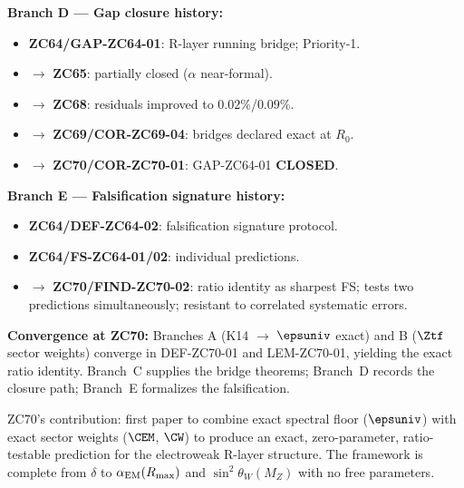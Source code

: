 \documentclass[12pt, a4paper]{article}
\renewcommand{\swsq}{\sin^2\!\theta_W}
\renewcommand{\aEM}{\alpha_{\rm EM}}
\begin{document}
\begin{genealogybox}[title={How ZC70's Key Objects Trace Back}]
\textbf{Branch D --- Gap closure history:}
\begin{itemize}[leftmargin=2em, noitemsep]
  \item \textbf{ZC64/GAP-ZC64-01}: R-layer running bridge; Priority-1.
  \item $\to$ \textbf{ZC65}: partially closed ($\alpha$ near-formal).
  \item $\to$ \textbf{ZC68}: residuals improved to $0.02\%$/$0.09\%$.
  \item $\to$ \textbf{ZC69/COR-ZC69-04}: bridges declared exact at $R_0$.
  \item $\to$ \textbf{ZC70/COR-ZC70-01}: GAP-ZC64-01 \textbf{CLOSED}.
\end{itemize}

\textbf{Branch E --- Falsification signature history:}
\begin{itemize}[leftmargin=2em, noitemsep]
  \item \textbf{ZC64/DEF-ZC64-02}: falsification signature protocol.
  \item \textbf{ZC64/FS-ZC64-01/02}: individual predictions.
  \item $\to$ \textbf{ZC70/FIND-ZC70-02}: ratio identity as sharpest FS;
    tests two predictions simultaneously; resistant to
    correlated systematic errors.
\end{itemize}

\textbf{Convergence at ZC70:}
Branches A (K14 $\to$ $\epsuniv$ exact) and B ($\Ztf$
sector weights) converge in DEF-ZC70-01 and LEM-ZC70-01,
yielding the exact ratio identity.
Branch~C supplies the bridge theorems; Branch~D records
the closure path; Branch~E formalizes the falsification.

ZC70's contribution: first paper to combine exact spectral floor
($\epsuniv$) with exact sector weights ($\CEM$, $\CW$) to
produce an exact, zero-parameter, ratio-testable prediction
for the electroweak R-layer structure.
The framework is complete from $\delta$ to
$\aEM(R_{\max})$ and $\swsq(M_Z)$ with no free parameters.
\end{genealogybox}

\end{document}
